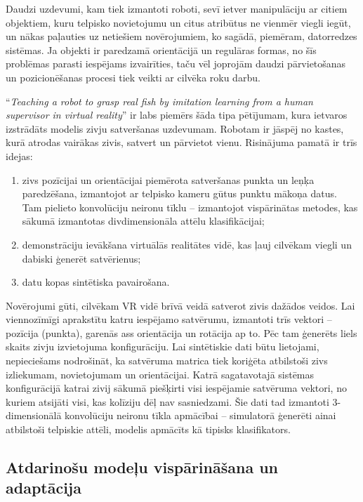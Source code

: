 \documentclass[12pt, a4paper]{article}
\numberwithin{equation}{section} %
\begin{document}
Daudzi uzdevumi, kam tiek izmantoti roboti, sevī ietver manipulāciju ar citiem objektiem, kuru telpisko novietojumu un citus atribūtus ne vienmēr viegli iegūt, un nākas paļauties uz netiešiem novērojumiem, ko sagādā, piemēram, datorredzes sistēmas. Ja objekti ir paredzamā orientācijā un regulāras formas, no šīs problēmas parasti iespējams izvairīties, taču vēl joprojām daudzi pārvietošanas un pozicionēšanas procesi tiek veikti ar cilvēka roku darbu.

``\textit{Teaching a robot to grasp real fish by imitation learning from a human supervisor in virtual reality}'' \cite{dyrstad2018teaching} ir labs piemērs šāda tipa pētījumam, kura ietvaros izstrādāts modelis zivju satveršanas uzdevumam. Robotam ir jāspēj no kastes, kurā atrodas vairākas zivis, satvert un pārvietot vienu. Risinājuma pamatā ir trīs idejas:

\begin{enumerate}
    \item zivs pozīcijai un orientācijai piemērota satveršanas punkta un leņķa paredzēšana, izmantojot ar telpisko kameru gūtus punktu mākoņa datus. Tam pielieto konvolūciju neironu tīklu -- izmantojot vispārinātas metodes, kas sākumā izmantotas divdimensionāla attēlu klasifikācijai;
    \item demonstrāciju ievākšana virtuālās realitātes vidē, kas ļauj cilvēkam viegli un dabiski ģenerēt satvērienus;
    \item datu kopas sintētiska pavairošana.
\end{enumerate}

Novērojumi gūti, cilvēkam VR vidē brīvā veidā satverot zivis dažādos veidos. Lai viennozīmīgi aprakstītu katru iespējamo satvērumu, izmantoti trīs vektori -- pozīcija (punkta), garenās ass orientācija un rotācija ap to.  Pēc tam ģenerēts liels skaits zivju izvietojuma konfigurāciju. Lai sintētiskie dati būtu lietojami, nepieciešams nodrošināt, ka satvēruma matrica tiek koriģēta atbilstoši zivs izliekumam, novietojumam un orientācijai. Katrā sagatavotajā sistēmas konfigurācijā katrai zivij sākumā piešķirti visi iespējamie satvēruma vektori, no kuriem atsijāti visi, kas kolīziju dēļ nav sasniedzami. Šie dati tad izmantoti 3-dimensionālā konvolūciju neironu tīkla apmācībai -- simulatorā ģenerēti ainai atbilstoši telpiskie attēli, modelis apmācīts kā tipisks klasifikators.

\subsection{Atdarinošu modeļu vispārināšana un adaptācija}
\end{document}
